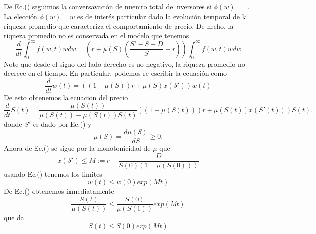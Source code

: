 \documentclass[12pt]{article}
\begin{document}
\quad De Ec.(\cite{ec31}) seguimos la conversavación de nuemro total de inversores si $\phi(w)=1$. La elección $\phi(w)=w$ es de interés partícular dado la evolución temporal de la riqueza promedio que caracteriza el comportamiento de precio. De hecho, la riqueza promedio no es conservada en el modelo que tenemos
\begin{equation}
\frac{d}{dt}\int^{\infty}_{0}f(w,t)wdw=\left(r+\mu(S)\left(\frac{S'-S+D}{S}-r\right)\right)\int^{\infty}_{0}f(w,t)wdw\label{ec33}
\end{equation}
Note que desde el signo del lado derecho es no negativo, la riqueza promedio no decrece en el tiempo. En partícular, podemos re escribir la ecuación como
\begin{equation}
\frac{d}{dt}w(t)=((1-\mu(S))r+ \mu(S)x(S'))w(t) \label{ec34}
\end{equation}
De esto obtenemos la ecuacion del precio
\begin{equation}
\frac{d}{dt}S(t)=\frac{\mu(S(t))}{\mu(S(t))-\mu(S(t))S(t)}((1-\mu(S(t)))r+\mu(S(t))x(S'(t)))S(t).
\end{equation}
donde $S'$ es dado por Ec.(\cite{ec22}) y
\begin{equation}
\dot{\mu}(S)=\frac{d\mu(S)}{dS}\geq 0. 
\end{equation}
Ahora de Ec.(\cite{ec24}) se sigue por la monotonicidad de $\mu$ que
$$
x(S')\leq M:= r+\frac{D}{S(0)(1-\mu(S(0)))}
$$
usando Ec.(\cite{ec34}) tenemos los limites
\begin{equation}
w(t)\leq w(0)exp(Mt)\label{ec36}
\end{equation}
De Ec.(\cite{12}) obtenemos inmediatamente
$$
\frac{S(t)}{\mu(S(t))}\leq \frac{S(0)}{\mu(S(0))}exp(Mt)
$$
que da
\begin{equation}
S(t)\leq S(0)exp(Mt) \label{ec37}
\end{equation}
\end{document}
